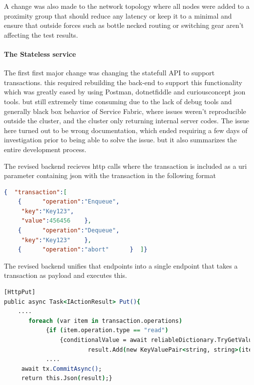 \documentclass[a4paper,10pt,titlepage]{report}
\begin{document}
    A change was also made to the network topology where all nodes were added to a proximity group that should reduce any latency or keep it to a minimal and ensure that outside forces such as bottle necked routing or switching gear aren't affecting the test results.  \\
    
    
    \paragraph{The Stateless service}
    
    
    The first first major change was changing the statefull API to support transactions. this required rebuilding the back-end to support this functionality which was greatly eased by using Postman, dotnetfiddle and curiousconcept json tools. but still extremely time consuming due to the lack of debug tools and generally black box behavior of Service Fabric, where issues weren't reproducible outside the cluster, and the cluster only returning internal server codes. The issue here turned out to be wrong documentation, which ended requiring a few days of investigation prior to being able to solve the issue. but it also summarizes the entire development process.\\
    \vspace{5mm}
    
    
    The revised backend recieves http calls where the transaction is included as a uri parameter containing json with the transaction in the following format\\
    \begin{lstlisting}[language=json]
{  "transaction":[
    {      "operation":"Enqueue",
     "key":"Key123",
     "value":456456    },
    {      "operation":"Dequeue",
     "key":"Key123"    },
    {      "operation":"abort"      }  ]}
    \end{lstlisting}  
    
    The revised backend unifies that endpoints into a single endpoint that takes a transaction as payload and executes this. 
    \begin{lstlisting}[language=csh]
[HttpPut]
public async Task<IActionResult> Put(){
    ....
       foreach (var item in transaction.operations)
            {if (item.operation.type == "read")
                {conditionalValue = await reliableDictionary.TryGetValueAsync(tx, item.key.Value);
                        result.Add(new KeyValuePair<string, string>(item.key.Value, value.ToString()));}
            ....
     await tx.CommitAsync();
     return this.Json(result);}
\end{lstlisting}  
\end{document}
